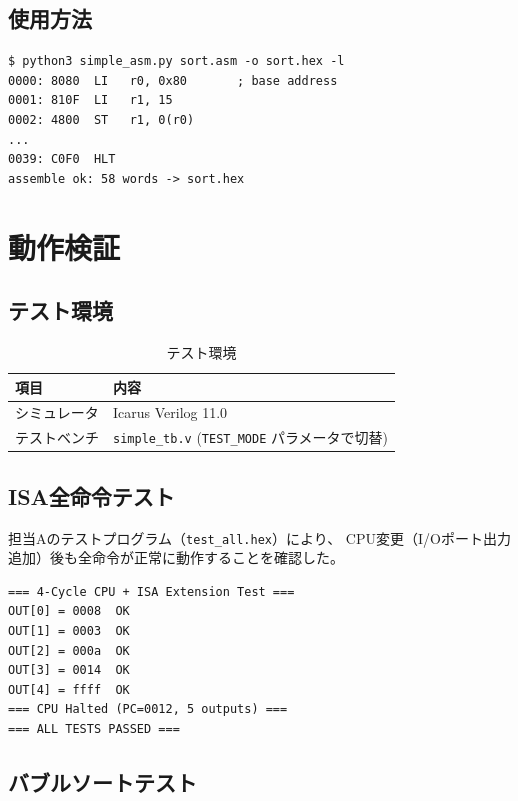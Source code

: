 \documentclass[a4paper,11pt]{ltjsarticle}
\begin{document}
\subsection{使用方法}

\begin{lstlisting}[language={},caption={アセンブラの使用例}]
$ python3 simple_asm.py sort.asm -o sort.hex -l
0000: 8080  LI   r0, 0x80       ; base address
0001: 810F  LI   r1, 15
0002: 4800  ST   r1, 0(r0)
...
0039: C0F0  HLT
assemble ok: 58 words -> sort.hex
\end{lstlisting}


\section{動作検証}

\subsection{テスト環境}

\begin{table}[h]
\centering
\caption{テスト環境}
\begin{tabular}{ll}
\toprule
項目 & 内容 \\
\midrule
シミュレータ & Icarus Verilog 11.0 \\
テストベンチ & \texttt{simple\_tb.v} (\texttt{TEST\_MODE} パラメータで切替) \\
\bottomrule
\end{tabular}
\end{table}

\subsection{ISA全命令テスト}

担当Aのテストプログラム（\texttt{test\_all.hex}）により、
CPU変更（I/Oポート出力追加）後も全命令が正常に動作することを確認した。

\begin{lstlisting}[language={},frame=single,caption={ISAテスト結果}]
=== 4-Cycle CPU + ISA Extension Test ===
OUT[0] = 0008  OK
OUT[1] = 0003  OK
OUT[2] = 000a  OK
OUT[3] = 0014  OK
OUT[4] = ffff  OK
=== CPU Halted (PC=0012, 5 outputs) ===
=== ALL TESTS PASSED ===
\end{lstlisting}

\subsection{バブルソートテスト}
\end{document}

